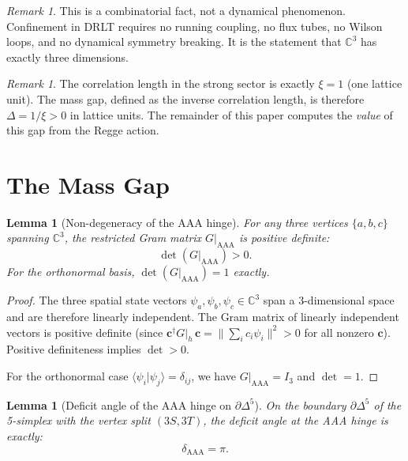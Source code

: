 \documentclass[12pt]{article}
\newtheorem{lemma}[theorem]{Lemma}
\theoremstyle{remark}
\newtheorem{remark}[theorem]{Remark}
\begin{document}
\begin{remark}
This is a combinatorial fact, not a dynamical phenomenon. Confinement
in DRLT requires no running coupling, no flux tubes, no Wilson loops,
and no dynamical symmetry breaking. It is the statement that
$\mathbb{C}^3$ has exactly three dimensions.
\end{remark}

\begin{remark}
The correlation length in the strong sector is exactly $\xi = 1$ (one
lattice unit). The mass gap, defined as the inverse correlation length,
is therefore $\Delta = 1/\xi > 0$ in lattice units. The remainder of
this paper computes the \emph{value} of this gap from the Regge action.
\end{remark}

\section{The Mass Gap}
\label{sec:massgap}

\begin{lemma}[Non-degeneracy of the AAA hinge]
\label{lem:det}
For any three vertices $\{a, b, c\}$ spanning $\mathbb{C}^3$, the
restricted Gram matrix $G|_{\mathrm{AAA}}$ is positive definite:
\begin{equation}
\det(G|_{\mathrm{AAA}}) > 0.
\end{equation}
For the orthonormal basis, $\det(G|_{\mathrm{AAA}}) = 1$ exactly.
\end{lemma}

\begin{proof}
The three spatial state vectors $\psi_a, \psi_b, \psi_c \in \mathbb{C}^3$
span a 3-dimensional space and are therefore linearly independent.
The Gram matrix of linearly independent vectors is positive definite
(since $\mathbf{c}^\dagger G|_h\, \mathbf{c} =
\|\sum_i c_i \psi_i\|^2 > 0$ for all nonzero $\mathbf{c}$).
Positive definiteness implies $\det > 0$.

For the orthonormal case $\langle \psi_i | \psi_j \rangle = \delta_{ij}$,
we have $G|_{\mathrm{AAA}} = I_3$ and $\det = 1$.
\end{proof}

\begin{lemma}[Deficit angle of the AAA hinge on $\partial\Delta^5$]
\label{lem:delta}
On the boundary $\partial\Delta^5$ of the 5-simplex with the vertex
split $(3S, 3T)$, the deficit angle at the AAA hinge is exactly:
\begin{equation}
\boxed{\delta_{\mathrm{AAA}} = \pi.}
\end{equation}
\end{lemma}
\end{document}
